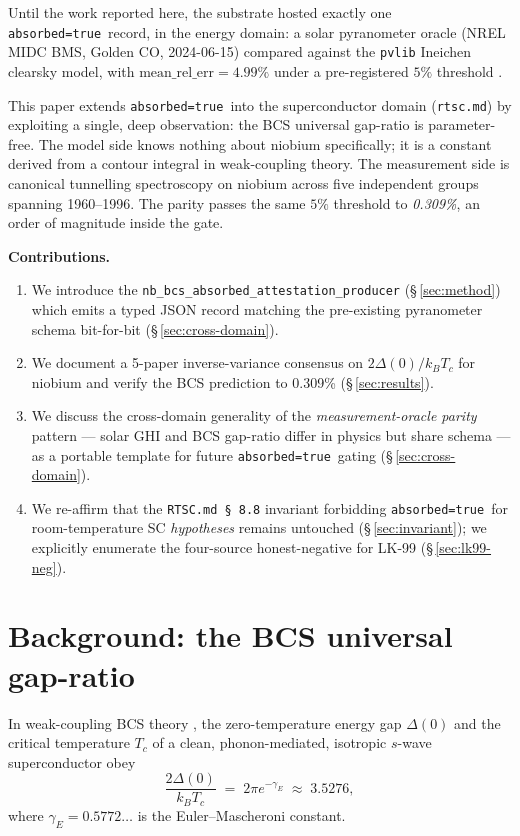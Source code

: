 \documentclass[11pt,a4paper]{article}
\newcommand{\absorbedtrue}{\textcolor{honestgreen}{\texttt{absorbed=true}}}
\begin{document}
Until the work reported here, the substrate hosted exactly one
\absorbedtrue\ record, in the energy domain: a solar pyranometer
oracle (NREL MIDC BMS, Golden CO, 2024-06-15) compared against the
\texttt{pvlib} Ineichen clearsky model, with \(\mathrm{mean\_rel\_err}
= 4.99\%\) under a pre-registered \(5\%\) threshold
\cite{pvlib2024,nrelmidc}.

This paper extends \absorbedtrue\ into the superconductor domain
(\texttt{rtsc.md}) by exploiting a single, deep observation: the BCS
universal gap-ratio is parameter-free. The model side knows nothing
about niobium specifically; it is a constant derived from a contour
integral in weak-coupling theory. The measurement side is canonical
tunnelling spectroscopy on niobium across five independent
groups spanning 1960--1996. The parity passes the same \(5\%\)
threshold to \emph{0.309\%}, an order of magnitude inside the gate.

\medskip
\noindent\textbf{Contributions.}
\begin{enumerate}\itemsep0.3em
\item We introduce the \texttt{nb\_bcs\_absorbed\_attestation\_producer}
  (\S\,\ref{sec:method}) which emits a typed JSON record matching the
  pre-existing pyranometer schema bit-for-bit (\S\,\ref{sec:cross-domain}).
\item We document a 5-paper inverse-variance consensus on
  \(2\Delta(0)/k_{B}T_{c}\) for niobium and verify the BCS prediction
  to 0.309\% (\S\,\ref{sec:results}).
\item We discuss the cross-domain generality of the
  \emph{measurement-oracle parity} pattern --- solar GHI and BCS
  gap-ratio differ in physics but share schema --- as a portable
  template for future \absorbedtrue\ gating (\S\,\ref{sec:cross-domain}).
\item We re-affirm that the \texttt{RTSC.md \S\,8.8} invariant
  forbidding \absorbedtrue\ for room-temperature SC \emph{hypotheses}
  remains untouched (\S\,\ref{sec:invariant}); we explicitly enumerate
  the four-source honest-negative for LK-99 (\S\,\ref{sec:lk99-neg}).
\end{enumerate}

\section{Background: the BCS universal gap-ratio}
\label{sec:bcs}

In weak-coupling BCS theory \cite{bcs1957}, the zero-temperature
energy gap \(\Delta(0)\) and the critical temperature \(T_{c}\) of a
clean, phonon-mediated, isotropic $s$-wave superconductor obey
\begin{equation}
\label{eq:bcs-ratio}
\frac{2\Delta(0)}{k_{B} T_{c}}
\;=\;
2\pi e^{-\gamma_{E}}
\;\approx\;
3.5276,
\end{equation}
where \(\gamma_{E} = 0.5772\ldots\) is the Euler--Mascheroni constant.
\end{document}
